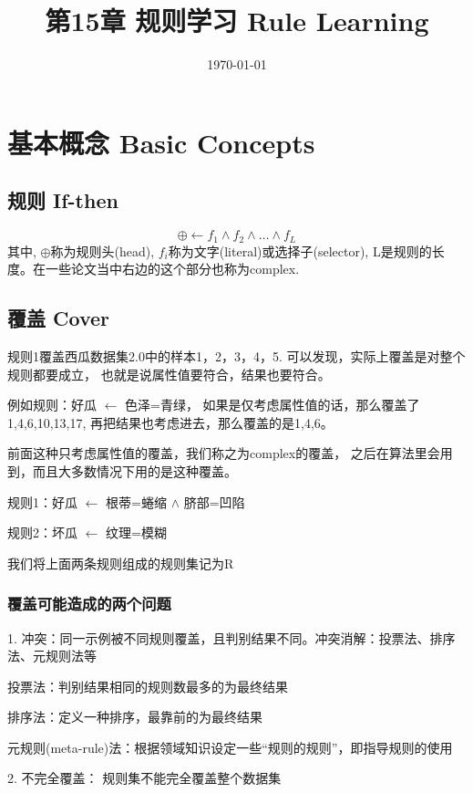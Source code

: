 \documentclass[UTF8]{article}
\title{第15章 规则学习 Rule Learning}
\author{}
\date{\today}
\begin{document}
\maketitle
\section{基本概念 Basic Concepts}
\subsection{规则 If-then}
    \begin{equation}
        \oplus \leftarrow f_1 \wedge f_2 \wedge \dots \wedge f_L
    \end{equation}
    其中, $\oplus$称为规则头(head), $f_i$称为文字(literal)或选择子(selector),
    L是规则的长度。在一些论文当中右边的这个部分也称为complex.

\subsection{覆盖 Cover}
    规则1覆盖西瓜数据集2.0中的样本1，2，3，4，5.
    可以发现，实际上覆盖是对整个规则都要成立，
    也就是说属性值要符合，结果也要符合。

    例如规则：好瓜 $\leftarrow$ 色泽=青绿，
    如果是仅考虑属性值的话，那么覆盖了1,4,6,10,13,17,
    再把结果也考虑进去，那么覆盖的是1,4,6。

    前面这种只考虑属性值的覆盖，我们称之为complex的覆盖，
    之后在算法里会用到，而且大多数情况下用的是这种覆盖。
    
    规则1：好瓜 $\leftarrow$ 根蒂=蜷缩 $\wedge$ 脐部=凹陷
    
    规则2：坏瓜 $\leftarrow$ 纹理=模糊

    我们将上面两条规则组成的规则集记为R

\subsubsection{覆盖可能造成的两个问题}
    1. 冲突：同一示例被不同规则覆盖，且判别结果不同。冲突消解：投票法、排序法、元规则法等  
        
    投票法：判别结果相同的规则数最多的为最终结果

    排序法：定义一种排序，最靠前的为最终结果

    元规则(meta-rule)法：根据领域知识设定一些“规则的规则”，即指导规则的使用
        
    2. 不完全覆盖： 规则集不能完全覆盖整个数据集
\end{document}
